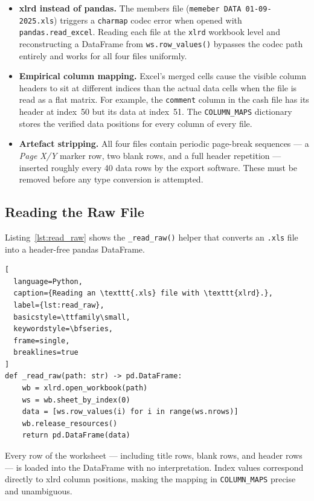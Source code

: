 \begin{itemize}
  \item \textbf{xlrd instead of pandas.} The members file (\texttt{memeber DATA
        01-09-2025.xls}) triggers a \texttt{charmap} codec error when opened with
        \texttt{pandas.read\_excel}. Reading each file at the \texttt{xlrd}
        workbook level and reconstructing a DataFrame from \texttt{ws.row\_values()}
        bypasses the codec path entirely and works for all four files uniformly.

  \item \textbf{Empirical column mapping.} Excel's merged cells cause the visible
        column headers to sit at different indices than the actual data cells when
        the file is read as a flat matrix. For example, the \texttt{comment} column
        in the cash file has its header at index~50 but its data at index~51. The
        \texttt{COLUMN\_MAPS} dictionary stores the verified data positions for every
        column of every file.

  \item \textbf{Artefact stripping.} All four files contain periodic page-break
        sequences — a \textit{Page X/Y} marker row, two blank rows, and a full
        header repetition — inserted roughly every 40 data rows by the export
        software. These must be removed before any type conversion is attempted.
\end{itemize}

\subsection{Reading the Raw File}

Listing~\ref{lst:read_raw} shows the \texttt{\_read\_raw()} helper that converts
an \texttt{.xls} file into a header-free pandas DataFrame.

\begin{lstlisting}[
  language=Python,
  caption={Reading an \texttt{.xls} file with \texttt{xlrd}.},
  label={lst:read_raw},
  basicstyle=\ttfamily\small,
  keywordstyle=\bfseries,
  frame=single,
  breaklines=true
]
def _read_raw(path: str) -> pd.DataFrame:
    wb = xlrd.open_workbook(path)
    ws = wb.sheet_by_index(0)
    data = [ws.row_values(i) for i in range(ws.nrows)]
    wb.release_resources()
    return pd.DataFrame(data)
\end{lstlisting}

Every row of the worksheet — including title rows, blank rows, and header rows —
is loaded into the DataFrame with no interpretation. Index values correspond
directly to xlrd column positions, making the mapping in \texttt{COLUMN\_MAPS}
precise and unambiguous.

